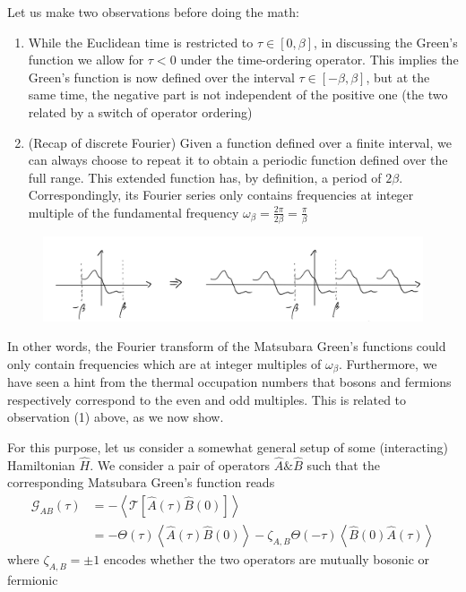 Let us make two observations before doing the math:
\begin{enumerate}
    \item While the Euclidean time is restricted to $\tau\in\left[0,\beta\right]$, in discussing the Green's function we allow for $\tau<0$ under the time-ordering operator. This implies the Green's function is now defined over the interval $\tau \in \left[-\beta,\beta\right]$, but at the same time, the negative part is not independent of the positive one (the two related by a switch of operator ordering)
    \item (Recap of discrete Fourier) Given a function defined over a finite interval, we can always choose to repeat it to obtain a periodic function defined over the full range. This extended function has, by definition, a period of $2\beta$. Correspondingly, its Fourier series only contains frequencies at integer multiple of the fundamental frequency $\omega_\beta=\frac{2\pi}{2\beta}=\frac{\pi}{\beta}$
\end{enumerate}
\begin{figure}[H]
    \centering
    \includegraphics[width=\textwidth]{jupyterbook/data/fig/lec22-fig01.png}
\end{figure}

In other words, the Fourier transform of the Matsubara Green's functions could only contain frequencies which are at integer multiples of $\omega_\beta$. Furthermore, we have seen a hint from the thermal occupation numbers that bosons and fermions respectively correspond to the even and odd multiples. This is related to observation (1) above, as we now show.

For this purpose, let us consider a somewhat general setup of some (interacting) Hamiltonian $\hat{H}$. We consider a pair of operators $\hat{A}\&\hat{B}$ such that the corresponding Matsubara Green's function reads
\begin{align*}
    \mathcal{G} _{AB}\left( \tau \right) &=-\left< \mathcal{T} \left[ \hat{A}\left( \tau \right) \hat{B}\left( 0 \right) \right] \right> \\
    &=-\Theta \left( \tau \right) \left< \hat{A}\left( \tau \right) \hat{B}\left( 0 \right) \right> -\zeta _{A,B}\Theta \left( -\tau \right) \left< \hat{B}\left( 0 \right) \hat{A}\left( \tau \right) \right>
\end{align*}
where $\zeta_{A,B}=\pm 1$ encodes whether the two operators are mutually bosonic or fermionic

